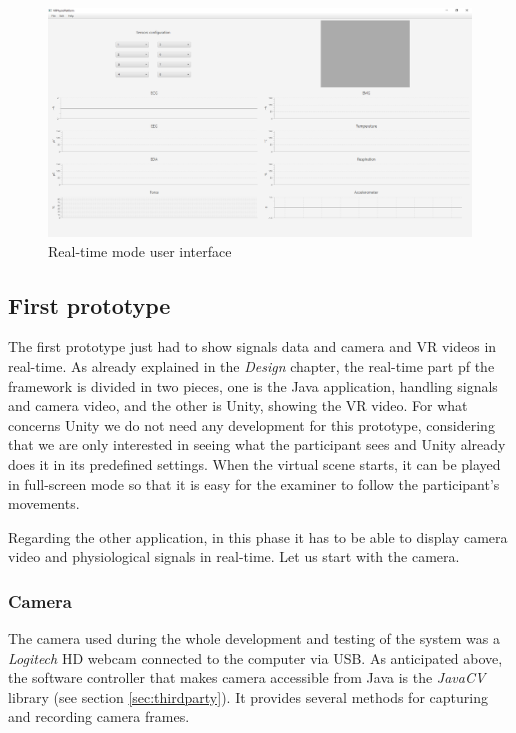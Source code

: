 \documentclass[binding=0.6cm,LaM]{sapthesis}
\begin{document}
\begin{figure}[p]
\centering
\includegraphics[scale=.46, angle=90]{images/realtime2}
\caption{Real-time mode user interface}
\end{figure}


\subsection{First prototype}
The first prototype just had to show signals data and camera and VR videos in real-time. As already explained in the \textit{Design} chapter, the real-time part pf the framework is divided in two pieces, one is the Java application, handling signals and camera video, and the other is Unity, showing the VR video. For what concerns Unity we do not need any development for this prototype, considering that we are only interested in seeing what the participant sees and Unity already does it in its predefined settings. When the virtual scene starts, it can be played in full-screen mode so that it is easy for the examiner to follow the participant's movements.

Regarding the other application, in this phase it has to be able to display camera video and physiological signals in real-time. Let us start with the camera. 

\subsubsection{Camera}

The camera used during the whole development and testing of the system was a \textit{Logitech} HD webcam connected to the computer via USB. As anticipated above, the software controller that makes camera accessible from Java is the \textit{JavaCV} library (see section \ref{sec:thirdparty}). It provides several methods for capturing and recording camera frames. 
\end{document}
